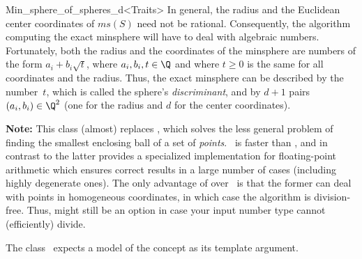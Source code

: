 \begin{ccRefClass}{Min_sphere_of_spheres_d<Traits>}
In general, the radius and the Euclidean center coordinates of $ms(S)$
need not be rational.  Consequently, the algorithm computing the exact
minsphere will have to deal with algebraic numbers.  Fortunately, both
the radius and the coordinates of the minsphere are numbers of the
form $a_i+b_i\sqrt{t}$, where $a_i,b_i,t\in \Q$ and where $t\ge 0$ is
the same for all coordinates and the radius.  Thus, the exact
minsphere can be described by the number~$t$, which is called the
sphere's \emph{discriminant}, and by $d+1$ pairs $(a_i,b_i)\in\Q^2$
(one for the radius and $d$ for the center coordinates).


\textbf{Note:} This class (almost) replaces
, which solves the less general
problem of finding the smallest enclosing ball of a set of
\emph{points}.  \ccRefName\ is faster than
, and in contrast to the latter
provides a specialized implementation for floating-point arithmetic
which ensures correct results in a large number of cases (including
highly degenerate ones).  The only advantage of
 over \ccRefName\ is that the former
can deal with points in homogeneous coordinates, in which case the
algorithm is division-free. Thus, 
might still be an option in case your input number type cannot
(efficiently) divide.

\ccRequirements
\ccIndexRequirements

The class \ccRefName\ expects a model of the concept
 as its template argument.


\ccTypes \ccIndexClassTypes





\end{ccRefClass}
